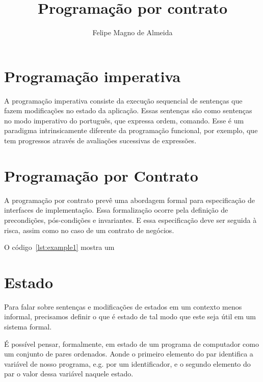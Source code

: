 \documentclass[12pt]{article}
\title{Programação por contrato}
\author{Felipe Magno de Almeida}
\begin{document}
 

\maketitle
     
\begin{resumo} 
  
\end{resumo}

\section{Programação imperativa}

A programação imperativa consiste da execução sequencial de sentenças
que fazem modificações no estado da aplicação. Essas sentenças são
como sentenças no modo imperativo do português, que expressa ordem,
comando. Esse é um paradigma intrinsicamente diferente da programação
funcional, por exemplo, que tem progressos através de avaliações
sucessivas de expressões.

\section{Programação por Contrato}

A programação por contrato prevê uma abordagem formal para
especificação de interfaces de implementação. Essa formalização ocorre
pela definição de precondições, pós-condições e invariantes. E essa
especificação deve ser seguida à risca, assim como no caso de um
contrato de negócios.

O código~\ref{lst:example1} mostra um 



\section{Estado}

Para falar sobre sentenças e modificações de estados em um contexto
menos informal, precisamos definir o que é estado de tal modo que este
seja útil em um sistema formal.

É possível pensar, formalmente, em estado de um programa de computador
como um conjunto de pares ordenados. Aonde o primeiro elemento do par
identifica a variável de nosso programa, e.g. por um identificador, e
o segundo elemento do par o valor dessa variável naquele estado.
\end{document}
